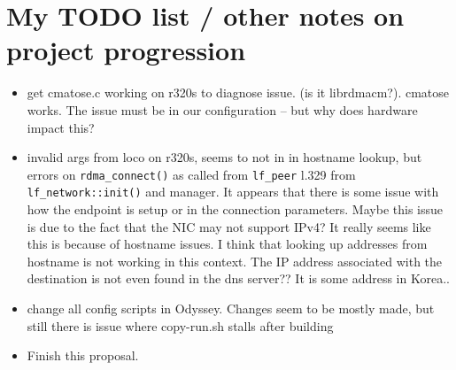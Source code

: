 \documentclass[sigplan,nonacm]{acmart}
\begin{document}
\section{My TODO list / other notes on project progression}
\begin{itemize}
    \item get cmatose.c working on r320s to diagnose issue. (is it librdmacm?). cmatose
    works. The issue must be in our configuration -- but why does hardware impact this?
    \item invalid args from loco on r320s, seems to not in in hostname lookup, but errors 
    on \texttt{rdma\_connect()} as called from \texttt{lf\_peer} l.329 from \texttt{lf\_network::init()} and manager.
    It appears that there is some issue with how the endpoint is setup or in the connection 
    parameters. Maybe this issue is due to the fact that the NIC may not support IPv4? 
    It really seems like this is because of hostname issues. I think that looking up addresses
    from hostname is not working in this context. The IP address associated with the destination 
    is not even found in the dns server?? It is some address in Korea..
    \item change all config scripts in Odyssey. Changes seem to be mostly made, but 
    still there is issue where copy-run.sh stalls after building
    \item Finish this proposal.
\end{itemize}


% 
% 
\end{document}
